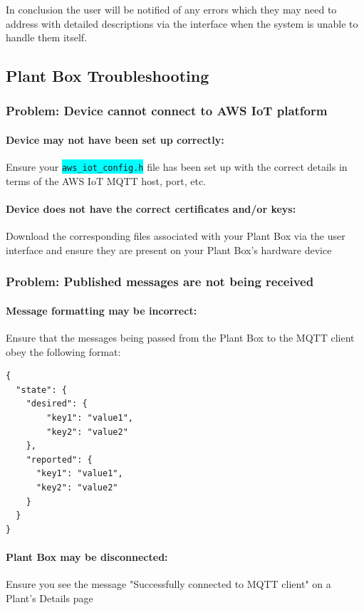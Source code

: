 \documentclass{article}
\begin{document}
	In conclusion the user will be notified of any errors which they may need to address with detailed descriptions via the interface when the system is unable to handle them itself.
	
\cleardoublepage	
	
	\subsection{Plant Box Troubleshooting}
		\subsubsection{Problem: Device cannot connect to AWS IoT platform}
			\paragraph{Device may not have been set up correctly:} 
				Ensure your \colorbox{cyan}{\lstinline[basicstyle=\ttfamily\color{white}]|aws_iot_config.h|} file has been set up with the correct details in terms of the AWS IoT MQTT host, port, etc.
			\paragraph{Device does not have the correct certificates and/or keys:}
				Download the corresponding files associated with your Plant Box via the user interface and ensure they are present on your Plant Box's hardware device
				
		\subsubsection{Problem: Published messages are not being received}
			\paragraph{Message formatting may be incorrect:}
				Ensure that the messages being passed from the Plant Box to the MQTT client obey the following format:
\begin{lstlisting}
{
  "state": {
    "desired": {
    	"key1": "value1",
    	"key2": "value2"
    },
    "reported": {
      "key1": "value1",
      "key2": "value2"
    }
  }
}
\end{lstlisting}
			\paragraph{Plant Box may be disconnected:} Ensure you see the message "Successfully connected to MQTT client" on a Plant's Details page
\end{document}
